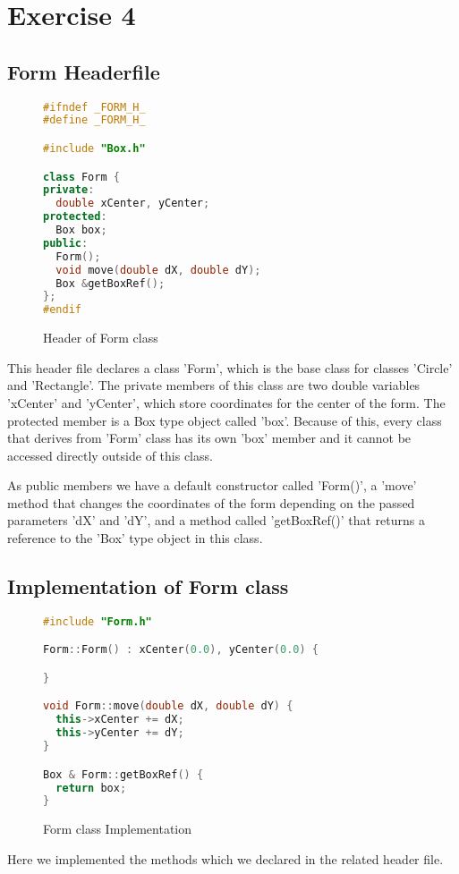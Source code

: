 \documentclass[a4paper, 10pt]{article}
\begin{document}
\newpage
\section{Exercise 4}
\subsection{Form Headerfile}
\begin{figure}[H]
\begin{lstlisting}[language=c++]
#ifndef _FORM_H_
#define _FORM_H_

#include "Box.h"

class Form {
private:
  double xCenter, yCenter;
protected:
  Box box;
public:
  Form();
  void move(double dX, double dY);
  Box &getBoxRef();
};
#endif
\end{lstlisting}
\caption{Header of Form class}
\end{figure}
This header file declares a class 'Form', which is the base class for classes 'Circle' and 'Rectangle'. The private members of this class are two double variables 'xCenter' and 'yCenter', which store coordinates for the center of the form.
The protected member is a Box type object called 'box'. Because of this, every class that derives from 'Form' class has its own 'box' member and it cannot be accessed directly outside of this class.

As public members we have a default constructor called 'Form()', a 'move' method that changes the coordinates of the form depending on the passed parameters 'dX' and 'dY', and a method called 'getBoxRef()' that returns a reference to the 'Box' type object in this class.

\subsection{Implementation of Form class}
\begin{figure}[H]
\begin{lstlisting}[language=c++]
#include "Form.h"

Form::Form() : xCenter(0.0), yCenter(0.0) {

}

void Form::move(double dX, double dY) {
  this->xCenter += dX;
  this->yCenter += dY;
}

Box & Form::getBoxRef() {
  return box;
}
\end{lstlisting}
\caption{Form class Implementation}
\end{figure}
Here we implemented the methods which we declared in the related header file.
\end{document}
